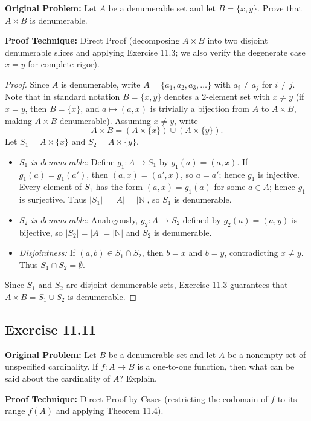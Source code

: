 \documentclass[11pt, letterpaper]{article}
\theoremstyle{definition}
\theoremstyle{remark}
\begin{document}
\textbf{Original Problem:} Let $A$ be a denumerable set and let $B = \{x, y\}$. Prove that $A \times B$ is denumerable.

\textbf{Proof Technique:} Direct Proof (decomposing $A \times B$ into two disjoint denumerable slices and applying Exercise 11.3; we also verify the degenerate case $x = y$ for complete rigor).

\begin{proof}
Since $A$ is denumerable, write $A = \{a_1, a_2, a_3, \dots\}$ with $a_i \neq a_j$ for $i \neq j$. Note that in standard notation $B = \{x, y\}$ denotes a $2$-element set with $x \neq y$ (if $x = y$, then $B = \{x\}$, and $a \mapsto (a, x)$ is trivially a bijection from $A$ to $A \times B$, making $A \times B$ denumerable). Assuming $x \neq y$, write
\[
A \times B = (A \times \{x\}) \cup (A \times \{y\}).
\]
Let $S_1 = A \times \{x\}$ and $S_2 = A \times \{y\}$.
\begin{itemize}
    \item \emph{$S_1$ is denumerable:} Define $g_1 : A \to S_1$ by $g_1(a) = (a, x)$. If $g_1(a) = g_1(a')$, then $(a, x) = (a', x)$, so $a = a'$; hence $g_1$ is injective. Every element of $S_1$ has the form $(a, x) = g_1(a)$ for some $a \in A$; hence $g_1$ is surjective. Thus $|S_1| = |A| = |\mathbb{N}|$, so $S_1$ is denumerable.
    \item \emph{$S_2$ is denumerable:} Analogously, $g_2 : A \to S_2$ defined by $g_2(a) = (a, y)$ is bijective, so $|S_2| = |A| = |\mathbb{N}|$ and $S_2$ is denumerable.
    \item \emph{Disjointness:} If $(a, b) \in S_1 \cap S_2$, then $b = x$ and $b = y$, contradicting $x \neq y$. Thus $S_1 \cap S_2 = \emptyset$.
\end{itemize}
Since $S_1$ and $S_2$ are disjoint denumerable sets, Exercise 11.3 guarantees that $A \times B = S_1 \cup S_2$ is denumerable.
\end{proof}

\subsection{Exercise 11.11}

\textbf{Original Problem:} Let $B$ be a denumerable set and let $A$ be a nonempty set of unspecified cardinality. If $f : A \to B$ is a one-to-one function, then what can be said about the cardinality of $A$? Explain.

\textbf{Proof Technique:} Direct Proof by Cases (restricting the codomain of $f$ to its range $f(A)$ and applying Theorem 11.4).
\end{document}
